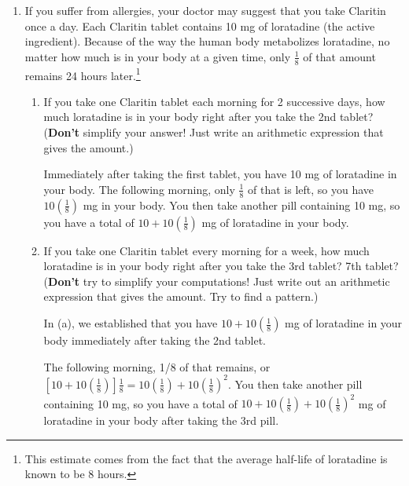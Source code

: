 \documentclass[main]{subfiles}
\begin{document}
 
 \begin{enumerate}
     

    \item If you suffer from allergies, your doctor may
    suggest that you take Claritin once a day.  Each Claritin tablet
    contains 10 mg of loratadine (the active ingredient).  Because of the
    way the human body metabolizes loratadine, no matter how much is in your
    body at a given time, only $\frac{1}{8}$ of that amount remains 24 hours
    later.\footnote{This estimate comes from the fact that the average
    half-life of loratadine is known to be 8 hours.}
    \begin{enumerate}
      \item
      \begin{problem}[\vfill]
      If you take one Claritin tablet each morning for 2 successive days,
      how much loratadine is in your body right after you take the 2nd
      tablet? (\textbf{Don't} simplify your answer! Just write an arithmetic expression that gives the amount.)
      \end{problem}

      \begin{solution}
      Immediately after taking the first tablet, you have 10 mg of
      loratadine in your body.  The following morning, only $\frac{1}{8}$
      of that is left, so you have $10 \left( \frac{1}{8} \right)$ mg in
      your body.  You then take another pill containing 10 mg, so you have
      a total of $\boxed{10 + 10 \left( \frac{1}{8} \right)}$ mg of
      loratadine in your body.
      \end{solution}      

      \item
      \begin{problem}[\vfill\vfill]
      If you take one Claritin tablet every morning for a week, how much
      loratadine is in your body right after you take the 3rd tablet?  7th
      tablet?  (\textbf{Don't} try to simplify your computations! Just write out an
      arithmetic expression that gives the amount. Try to find a pattern.)
      \end{problem}

      \begin{solution}
      In (a), we established that you have $10 + 10 \left( \frac{1}{8}
      \right)$ mg of loratadine in your body immediately after taking the
      2nd tablet.

      The following morning, 1/8 of that remains, or $\left[10 + 10 \left(
      \frac{1}{8} \right) \right] \frac{1}{8} = 10 \left( \frac{1}{8}
      \right) + 10 \left( \frac{1}{8} \right)^2$.  You then take another
      pill containing 10 mg, so you have a total of $10 + 10 \left(
      \frac{1}{8} \right) + 10 \left( \frac{1}{8} \right)^2$ mg of
      loratadine in your body after taking the 3rd pill.


\end{solution}
\end{enumerate}
\end{enumerate}
\end{document}
